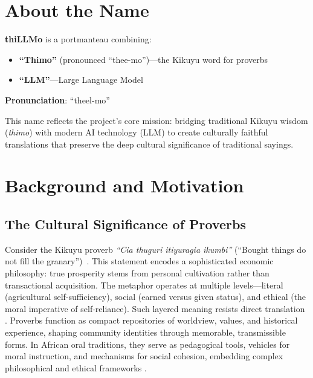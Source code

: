 \label{chap:introduction}

\section*{About the Name}

\textbf{thiLLMo} is a portmanteau combining:
\begin{itemize}
    \item \textbf{``Thimo''} (pronounced ``thee-mo'')---the Kikuyu word for proverbs
    \item \textbf{``LLM''}---Large Language Model
\end{itemize}

\textbf{Pronunciation}: ``theel-mo''

This name reflects the project's core mission: bridging traditional Kikuyu wisdom (\emph{thimo}) with modern AI technology (LLM) to create culturally faithful translations that preserve the deep cultural significance of traditional sayings.

\medskip

\section{Background and Motivation}
\label{sec:background}

\subsection{The Cultural Significance of Proverbs}
\label{subsec:proverb_significance}

Consider the Kikuyu proverb \emph{``Cia thuguri itiyuragia ikumbi''} (``Bought things do not fill the granary'')~\cite{ireri2019proverbs}. This statement encodes a sophisticated economic philosophy: true prosperity stems from personal cultivation rather than transactional acquisition. The metaphor operates at multiple levels—literal (agricultural self-sufficiency), social (earned versus given status), and ethical (the moral imperative of self-reliance). Such layered meaning resists direct translation \cite{finnegan2012oral}. Proverbs function as compact repositories of worldview, values, and historical experience, shaping community identities through memorable, transmissible forms. In African oral traditions, they serve as pedagogical tools, vehicles for moral instruction, and mechanisms for social cohesion, embedding complex philosophical and ethical frameworks \cite{mbiti1990african}.

